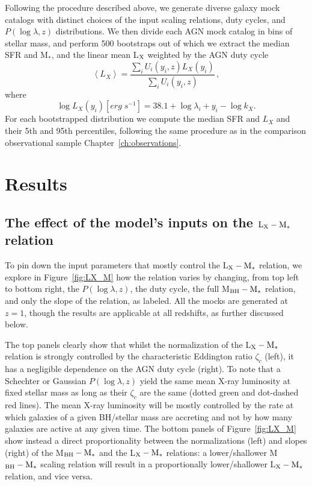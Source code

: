 Following the procedure described above, we generate diverse galaxy mock catalogs with distinct choices of the input scaling relations, duty cycles, and $P(\log\lambda,z)$ distributions. 
We then divide each AGN mock catalog in bins of stellar mass, and perform 500 bootstraps out of which we extract the median SFR and M$_*$, and the linear mean L$_{\rm X}$ weighted by the AGN duty cycle %
\begin{equation}
\left<L_X\right>=\frac{\sum_i U_i(y_i,z) L_X(y_i)} {\sum_i U_i(y_i,z)}\, ,
    \label{eq:meanLx}
\end{equation}
where 
\begin{equation}
\log L_X(y_i) [erg\;s^{-1}]=38.1 +\log \lambda_i +y_i-\log k_X.
\label{eq:Lx_210}
\end{equation} 
For each bootstrapped distribution we compute the median SFR and $L_X$ and their 5th and 95th percentiles, following the same procedure as in the comparison observational sample Chapter~\ref{ch:observations}.



\section{Results}\label{sec:results}

\subsection{The effect of the model's inputs on the ${\rm L}_{\rm X}-{\rm M}_*$ relation} \label{ssec:Fig2}

To pin down the input parameters that mostly control the L$_{\rm X}-{\rm M}_*$ relation, we explore in Figure~\ref{fig:LX_M} how the relation varies by changing, from top left to bottom right, the $P(\log \lambda,z)$, the duty cycle, the full M$_{\rm BH}-{\rm M}_*$ relation, and only the slope of the \citet{2015ApJ...813...82R} relation, as labeled. 
All the mocks are generated at $z=1$, though the results are applicable at all redshifts, as further discussed below.

The top panels clearly show that whilst the normalization of the L$_{\rm X}-{\rm M}_*$ relation is strongly controlled by the characteristic Eddington ratio $\zeta_c$ (left), it has a negligible dependence on the AGN duty cycle (right). To note that a Schechter or Gaussian $P(\log \lambda,z)$ yield the same mean X-ray luminosity at fixed stellar mass as long as their $\zeta_c$ are the same (dotted green and dot-dashed red lines). The mean X-ray luminosity will be mostly controlled by the rate at which galaxies of a given BH/stellar mass are accreting and not by how many galaxies are active at any given time. The bottom panels of Figure~\ref{fig:LX_M} show instead a direct proportionality between the normalizations (left) and slopes (right) of the  M$_{\rm BH}-{\rm M}_*$ and the L$_{\rm X}-{\rm M}_*$ relations: a lower/shallower M$_{\rm BH}-{\rm M}_*$ scaling relation will result in a proportionally lower/shallower L$_{\rm X}-{\rm M}_*$ relation, and vice versa.

